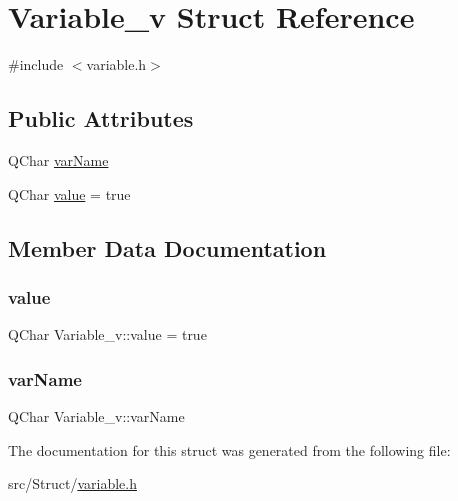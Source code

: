 \hypertarget{struct_variable__v}{}\section{Variable\+\_\+v Struct Reference}
\label{struct_variable__v}


{\ttfamily \#include $<$variable.\+h$>$}

\subsection*{Public Attributes}
\begin{DoxyCompactItemize}
\item 
Q\+Char \hyperlink{struct_variable__v_a52b714aff65f56f7e874e93b9467af98}{var\+Name}
\item 
Q\+Char \hyperlink{struct_variable__v_abc7c0bc4aba6731c69007d7982d4f57a}{value} = true
\end{DoxyCompactItemize}


\subsection{Member Data Documentation}
\mbox{\label{struct_variable__v_abc7c0bc4aba6731c69007d7982d4f57a}} 
\subsubsection{\texorpdfstring{value}{value}}
{\footnotesize\ttfamily Q\+Char Variable\+\_\+v\+::value = true}

\mbox{\label{struct_variable__v_a52b714aff65f56f7e874e93b9467af98}} 
\subsubsection{\texorpdfstring{var\+Name}{varName}}
{\footnotesize\ttfamily Q\+Char Variable\+\_\+v\+::var\+Name}



The documentation for this struct was generated from the following file\+:\begin{DoxyCompactItemize}
\item 
src/\+Struct/\hyperlink{_struct_2variable_8h}{variable.\+h}\end{DoxyCompactItemize}
